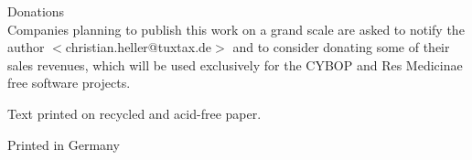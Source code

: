 \small{Donations\\
    Companies planning to publish this work on a grand scale are asked to
    notify the author \(<\)christian.heller@tuxtax.de\(>\) and to consider
    donating some of their sales revenues, which will be used exclusively for
    the CYBOP and Res Medicinae free software projects.}

\small{Text printed on recycled and acid-free paper.}

\small{Printed in Germany}

